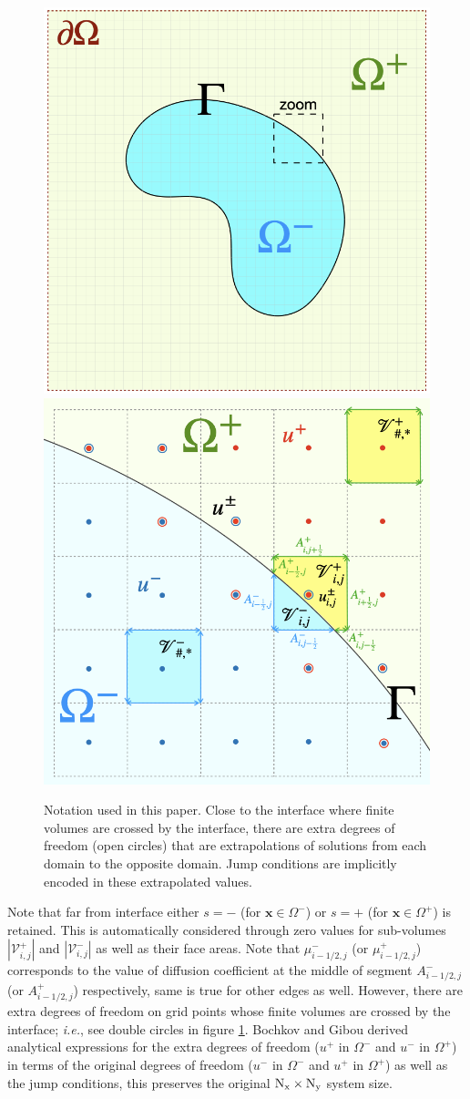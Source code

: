 \documentclass{elsarticle}
\begin{document}
\begin{figure}
\centering
\includegraphics[width=0.45\linewidth]{./figures/grids_full.png}
\includegraphics[width=0.45\linewidth]{./figures/grids.png}
\caption{Notation used in this paper. Close to the interface where finite volumes are crossed by the interface, there are extra degrees of freedom (open circles) that are extrapolations of solutions from each domain to the opposite domain. Jump conditions are implicitly encoded in these extrapolated values.}
\label{fig:grid}
\end{figure}

Note that far from interface either $s=-$ (for $\mathbf{x}\in \Omega^-$) or $s=+$ (for $\mathbf{x}\in \Omega^+$) is retained. This is automatically considered through zero values for sub-volumes $|\mathcal{V}_{i,j}^+|$ and $|\mathcal{V}_{i,j}^-|$ as well as their face areas. Note that $\mu_{i-1/2,j}^-$ (or $\mu_{i-1/2,j}^+$) corresponds to the value of diffusion coefficient at the middle of segment $A^-_{i-1/2,j}$ (or $A^+_{i-1/2,j}$) respectively, same is true for other edges as well. However, there are extra degrees of freedom on grid points whose finite volumes are crossed by the interface; \textit{i.e.}, see double circles in figure \ref{fig:grid}. Bochkov and Gibou derived analytical expressions for the extra degrees of freedom ($u^+$ in $\Omega^-$ and $u^-$ in $\Omega^+$) in terms of the original degrees of freedom ($u^-$ in $\Omega^-$ and $u^+$ in $\Omega^+$) as well as the jump conditions, this preserves the original $\rm N_x \times N_y$ system size. 
\end{document}
